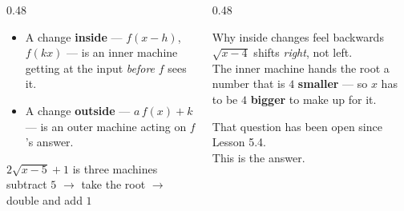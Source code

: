 \documentclass[aspectratio=169, 11pt]{beamer}
\begin{document}
\begin{frame}[t, plain]
  \begin{columns}[T]
    \begin{column}{0.48\textwidth}
      \footnotesize
      \begin{itemize}\setlength{\itemsep}{4pt}
        \item A change \textbf{inside} --- $f(x-h)$, $f(kx)$ --- is an inner machine getting at the
              input \emph{before} $f$ sees it.
        \item A change \textbf{outside} --- $a\,f(x)+k$ --- is an outer machine acting on $f$'s
              answer.
      \end{itemize}
      \vspace{5pt}
      \begin{block}{$2\sqrt{x-5}+1$ is three machines}
        subtract $5$ \; $\rightarrow$ \; take the root \; $\rightarrow$ \; double and add $1$
      \end{block}
    \end{column}
    \begin{column}{0.48\textwidth}
      \footnotesize
      \begin{block}{Why inside changes feel backwards}
        $\sqrt{x-4}$ shifts \emph{right}, not left. \\[4pt]
        The inner machine hands the root a number that is $4$ \textbf{smaller} --- so $x$ has to be
        $4$ \textbf{bigger} to make up for it.
      \end{block}
      \vspace{4pt}
      \begin{center}
      That question has been open since Lesson 5.4. \\ This is the answer.
      \end{center}
    \end{column}
  \end{columns}
\end{frame}
\end{document}
